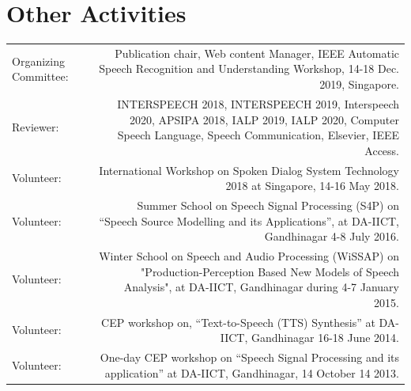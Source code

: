 \documentclass[10pt]{article}
\begin{document}
\section*{Other Activities}
\begin{tabular}{L!{\VRule}R}
Organizing Committee: & Publication chair, Web content Manager, IEEE Automatic Speech Recognition and Understanding Workshop, 14-18 Dec. 2019, Singapore.\vspace{0.1cm}\\
Reviewer: & INTERSPEECH 2018, INTERSPEECH 2019, Interspeech 2020, APSIPA 2018, IALP 2019, IALP 2020, Computer Speech Language, Speech Communication, Elsevier, IEEE Access.\vspace{0.1cm}\\
Volunteer:&International Workshop on Spoken Dialog System Technology 2018 at Singapore, 14-16 May 2018.\vspace{0.1cm}\\
Volunteer:&Summer School on Speech Signal Processing (S4P) on ``Speech Source Modelling and its Applications'', at {DA-IICT, Gandhinagar} 4-8 July 2016.\vspace{0.1cm}\\
Volunteer:& Winter School on Speech and Audio Processing (WiSSAP) on "Production-Perception Based New Models of Speech Analysis", at DA-IICT, Gandhinagar during 4-7 January 2015.\vspace{0.1cm}\\
Volunteer: & CEP workshop on, ``Text-to-Speech (TTS) Synthesis'' at DA-IICT, Gandhinagar 16-18 June 2014.\vspace{0.1cm}\\
Volunteer:& One-day CEP workshop on ``Speech Signal Processing and its application'' at {DA-IICT, Gandhinagar}, 14 October 14 2013.
\end{tabular}
\end{document}

